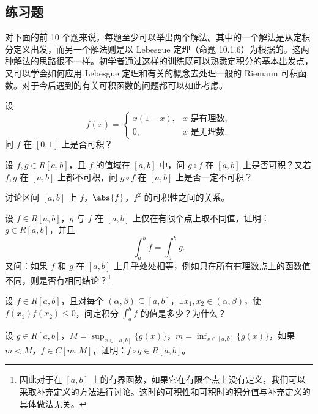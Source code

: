 \subsection{练习题}

对下面的前 10 个题来说，每题至少可以举出两个解法。其中的一个解法是从定积分定义出发，而另一个解法则是以 Lebesgue 定理（命题 10.1.6）为根据的。这两种解法的思路很不一样。初学者通过这样的训练既可以熟悉定积分的基本出发点，又可以学会如何应用 Lebesgue 定理和有关的概念去处理一般的 Riemann 可积函数。对于今后遇到的有关可积函数的问题都可以如此考虑。

\begin{xexercise}[1]
设
\[
  f(x)=
  \begin{cases}
    x(1-x),&x\text{ 是有理数},\\
    0,&x\text{ 是无理数}.
  \end{cases}
\]
问 $f$ 在 $[0,1]$ 上是否可积？
\end{xexercise}

\begin{xexercise}[2]
设 $f,g\in R[a,b]$，且 $f$ 的值域在 $[a,b]$ 中，问 $g\circ f$ 在 $[a,b]$ 上是否可积？又若 $f,g$ 在 $[a,b]$ 上都不可积，问 $g\circ f$ 在 $[a,b]$ 上是否一定不可积？
\end{xexercise}

\begin{xexercise}[3]
讨论区间 $[a,b]$ 上 $f$，$\abs{f}$，$f^2$ 的可积性之间的关系。
\end{xexercise}

\begin{xexercise}[4]
设 $f\in R[a,b]$，$g$ 与 $f$ 在 $[a,b]$ 上仅在有限个点上取不同值，证明：$g\in R[a,b]$，并且
\[
  \int_a^b f=\int_a^b g.
\]
又问：如果 $f$ 和 $g$ 在 $[a,b]$ 上几乎处处相等，例如只在所有有理数点上的函数值不同，则是否有相同结论？\footnote{因此对于在 $[a,b]$ 上的有界函数，如果它在有限个点上没有定义，我们可以采取补充定义的方法进行讨论。这时的可积性和可积时的积分值与补充定义的具体做法无关。}
\end{xexercise}

\begin{xexercise}[5]
设 $f\in R[a,b]$，且对每个 $(\alpha,\beta)\subseteq[a,b]$，$\exists x_1,x_2\in(\alpha,\beta)$，使 $f(x_1)f(x_2)\leqslant0$，问定积分 $\int_a^b f$ 的值是多少？为什么？
\end{xexercise}

\begin{xexercise}[6]
设 $g\in R[a,b]$，$M=\sup_{x\in[a,b]}\{g(x)\}$，$m=\inf_{x\in[a,b]}\{g(x)\}$，如果 $m<M$，$f\in C[m,M]$，证明：$f\circ g\in R[a,b]$。
\end{xexercise}

